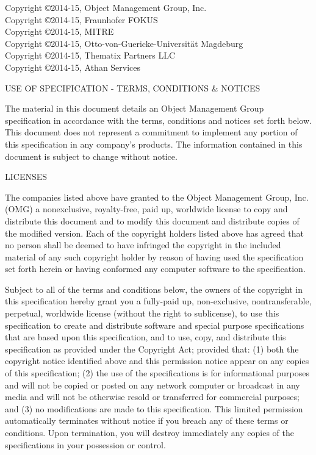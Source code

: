 \documentclass[10pt, a4paper]{isov2}
\newcommand{\OMGparagraph}[1]{
\vspace{23pt}
{\centerline {#1}}
\vspace{3pt}
}
\begin{document}
\thispagestyle{empty}
\clearpage

  

\noindent Copyright \copyright 2014-15, Object Management Group, Inc.\\
Copyright \copyright 2014-15, Fraunhofer FOKUS\\
Copyright \copyright 2014-15, MITRE\\
Copyright \copyright 2014-15, Otto-von-Guericke-Universit{\"a}t Magdeburg  \\
Copyright \copyright 2014-15, Thematix Partners LLC \\
Copyright \copyright 2014-15, Athan Services \\



\OMGparagraph{USE OF SPECIFICATION - TERMS, CONDITIONS \& NOTICES}
The material in this document details an Object Management Group specification in accordance with
 the terms, conditions and notices set forth below. This document does not represent a commitment
  to implement any portion of this specification in any company's products. The information
   contained in this document is subject to change without notice.


\OMGparagraph{LICENSES}
The companies listed above have granted to the Object Management Group, Inc. (OMG) a nonexclusive,
 royalty-free, paid up, worldwide license to copy and distribute this document and to modify this 
  document and distribute copies of the modified version. Each of the copyright holders listed 
   above has agreed that no person shall be deemed to have infringed the copyright in the included 
    material of any such copyright holder by reason of having used the specification set forth 
	 herein or having conformed any computer software to the specification.

Subject to all of the terms and conditions below, the owners of the copyright in this specification 
hereby grant you a fully-paid up, non-exclusive, nontransferable, perpetual, worldwide license 
 (without the right to sublicense), to use this specification to create and distribute software and 
  special purpose specifications that are based upon this specification, and to use, copy, and 
distribute this specification as provided under the Copyright Act; provided that: (1) both the 
 copyright notice identified above and this permission notice appear on any copies of this 
  specification; (2) the use of the specifications is for informational purposes and will not be 
copied or posted on any network computer or broadcast in any media and will not be otherwise resold 
 or transferred for commercial purposes; and (3) no modifications are made to this specification. 
This limited permission automatically terminates without notice if you breach any of these terms or 
 conditions. Upon termination, you will destroy immediately any copies of the specifications in 
  your possession or control.
\end{document}
